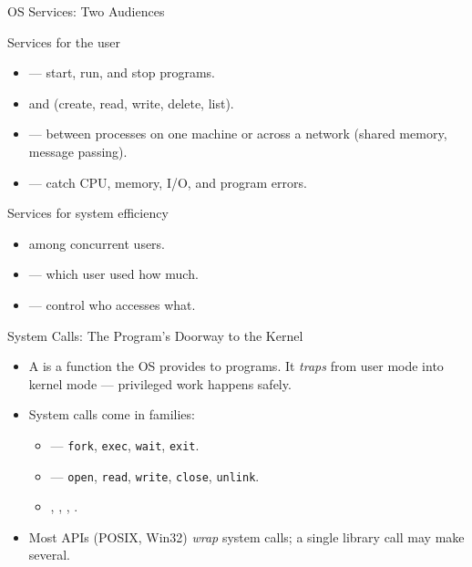 \documentclass[aspectratio=169]{beamer}
\begin{document}
\begin{frame}{OS Services: Two Audiences}
  \begin{block}{Services for the user}
    \begin{itemize}
      \item {} --- start, run, and stop programs.
      \item {} and 
        (create, read, write, delete, list).
      \item {} --- between processes on one machine or across
        a network (shared memory, message passing).
      \item {} --- catch CPU, memory, I/O, and program errors.
    \end{itemize}
  \end{block}
  \begin{block}{Services for system efficiency}
    \begin{itemize}
      \item {} among concurrent users.
      \item {} --- which user used how much.
      \item {} --- control who accesses what.
    \end{itemize}
  \end{block}
\end{frame}

\begin{frame}{System Calls: The Program's Doorway to the Kernel}
  \begin{itemize}
    \item A  is a function the OS provides to programs. It
      \emph{traps} from user mode into kernel mode --- privileged work happens
      safely.
    \item System calls come in families:
      \begin{itemize}
        \item {} --- \texttt{fork}, \texttt{exec},
          \texttt{wait}, \texttt{exit}.
        \item {} --- \texttt{open}, \texttt{read},
          \texttt{write}, \texttt{close}, \texttt{unlink}.
        \item {}, ,
          , .
      \end{itemize}
    \item Most APIs (POSIX, Win32) \emph{wrap} system calls; a single library
      call may make several.
  \end{itemize}
  \vspace{0.2cm}
\end{frame}
\end{document}

